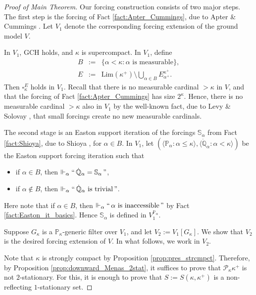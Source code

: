 \documentclass[a4paper,12pt,reqno,oneside]{amsart}
\theoremstyle{plain}
\newcommand{\mbb}{\mathbb}
\newcommand{\mcal}{\mathcal}
\newcommand{\ltpt}{\mathrm{Lim}}
\begin{document}
\begin{proof}[Proof of Main Theorem]
Our forcing construction consists of two major steps. The first step is the forcing of Fact \ref{fact:Apter_Cummings}, due to Apter \& Cummings \cite{AC}. Let $V_1$ denote the corresponding forcing extension of the ground model $V$.

In $V_1$, GCH holds, and $\kappa$ is supercompact. In $V_1$, define
\begin{eqnarray*}
B & := & \{ \alpha < \kappa : \mbox{$\alpha$ is measurable} \} , \\
E & := & \textstyle \ltpt ( \kappa^+ ) \setminus \bigcup_{\alpha \in B} E^{\kappa^+}_{\alpha^+} .
\end{eqnarray*}
Then $\square_\kappa^E$ holds in $V_1$. Recall that there is no measurable cardinal $> \kappa$ in $V$, and that the forcing of Fact \ref{fact:Apter_Cummings} has size $2^\kappa$. Hence,  there is no measurable cardinal $> \kappa$ also in $V_1$ by the well-known fact, due to Levy \& Solovay \cite{LS}, that small forcings create no new measurable cardinals.

The second stage is an Easton support iteration of the forcings $\mbb{S}_\alpha$ from Fact \ref{fact:Shioya}, due to Shioya \cite{Sh}, for $\alpha \in B$. In $V_1$, let $( \langle \mbb{P}_{\alpha} : \alpha \leq \kappa \rangle , \langle \dot{\mbb{Q}}_{\alpha} : \alpha < \kappa \rangle )$ be the Easton support forcing iteration such that
\begin{itemize}
\item if $\alpha \in B$, then $\Vdash_\alpha ``\, \dot{\mbb{Q}}_\alpha = \mbb{S}_\alpha \,"$,
\item if $\alpha \notin B$, then $\Vdash_\alpha ``\, \mbox{$\dot{\mbb{Q}}_\alpha$ is trivial} \,"$.
\end{itemize}
Here note that if $\alpha \in B$, then $\Vdash_\alpha ``\,\mbox{$\alpha$ is inaccessible}\,"$ by Fact \ref{fact:Easton_it_basics}. Hence $\mbb{S}_\alpha$ is defined in $V_1^{\mbb{P}_\alpha}$.

Suppose $G_\kappa$ is a $\mbb{P}_\kappa$-generic filter over $V_1$, and let $V_2 := V_1 [G_{\kappa}]$. We show that $V_2$ is the desired forcing extension of $V$. In what follows, we work in $V_2$.

Note that $\kappa$ is strongly compact by Proposition \ref{prop:pres_strcmpct}. Therefore, by Proposition \ref{prop:downward_Menas_2stat}, it suffices to prove that $\mcal{P}_\kappa \kappa^+$ is not $2$-stationary. For this, it is enough to prove that $S := S( \kappa , \kappa^+ )$ is a non-reflecting $1$-stationary set.



\end{proof}
\end{document}
